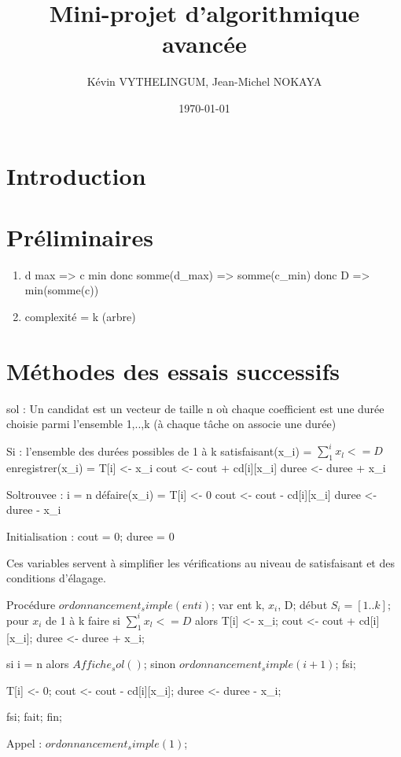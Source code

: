 \documentclass[a4paper, titlepage]{article}
\title{Mini-projet d'algorithmique avancée}      %
\author{Kévin VYTHELINGUM, Jean-Michel NOKAYA}           %
\date{\today}           %
\begin{document}
\maketitle
\tableofcontents
\newpage
\large

\section{Introduction}

\section{Préliminaires}

\begin{enumerate}
\item
	d max => c min
	donc somme(d_max) => somme(c_min)
	donc D => min(somme(c))
\item
	complexité = k (arbre)
	
\end{enumerate}

\section{Méthodes des essais successifs}
	sol : Un candidat est un vecteur de taille n où chaque coefficient est une durée choisie parmi l'ensemble {1,..,k} (à chaque tâche on associe une durée)
	
	Si : l'ensemble des durées possibles de 1 à k
	satisfaisant(x_{i}) = $\sum_{1}^{i} x_{l} <= D$
	enregistrer(x_{i}) = T[i] <- x_{i}
			     cout <- cout + cd[i][x_{i}]
			     duree <- duree + x_{i}
			     
	Soltrouvee : i = n
	défaire(x_{i}) = T[i] <- 0
			 cout <- cout - cd[i][x_{i}]
			 duree <- duree - x_{i}
			 
	Initialisation : cout = 0; duree = 0
	
		Ces variables servent à simplifier les vérifications au niveau de satisfaisant et des conditions d'élagage.
	
	
Procédure $ordonnancement_simple(ent i)$;
var ent k, $x_{i}$, D;
début
	$S_{i} = [1..k];$
	pour $x_{i}$ de 1 à k faire
		si $\sum_{1}^{i} x_{l} <= D$ alors 
			T[i] <- x_{i};
			cout <- cout + cd[i][x_{i}];
			duree <- duree + x_{i};
			
			si i = n alors $Affiche_sol()$;
			sinon
				$ordonnancement_simple(i+1)$;
			fsi;
		
		T[i] <- 0;
		cout <- cout - cd[i][x_{i}];
		duree <- duree - x_{i};	
		
		fsi;			
	fait;
fin;

Appel : $ordonnancement_simple(1)$;
		
\end{document}
